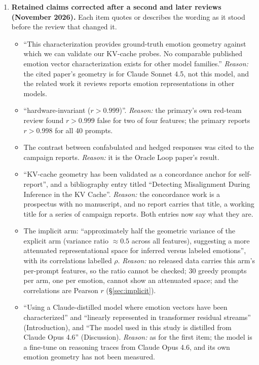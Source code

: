 \begin{enumerate}[leftmargin=*]
\begin{itemize}[nosep]
    \end{itemize}
    \item \label{app:item:secondread}\textbf{Retained claims corrected after a second and later reviews (November 2026).} Each item quotes or describes the wording as it stood before the review that changed it.
    \begin{itemize}[nosep]
        \item ``This characterization provides ground-truth emotion geometry against which we can validate our KV-cache probes. No comparable published emotion vector characterization exists for other model families.'' \emph{Reason:} the cited paper's geometry is for Claude Sonnet 4.5, not this model, and the related work it reviews reports emotion representations in other models.
        \item ``hardware-invariant ($r > 0.999$)''. \emph{Reason:} the primary's own red-team review found $r > 0.999$ false for two of four features; the primary reports $r > 0.998$ for all 40 prompts.
        \item The contrast between confabulated and hedged responses was cited to the campaign reports. \emph{Reason:} it is the Oracle Loop paper's result.
        \item ``KV-cache geometry has been validated as a concordance anchor for self-report'', and a bibliography entry titled ``Detecting Misalignment During Inference in the {KV} Cache''. \emph{Reason:} the concordance work is a prospectus with no manuscript, and no report carries that title, a working title for a series of campaign reports. Both entries now say what they are.
        \item The implicit arm: ``approximately half the geometric variance of the explicit arm (variance ratio $\approx 0.5$ across all features), suggesting a more attenuated representational space for inferred versus labeled emotions'', with its correlations labelled $\rho$. \emph{Reason:} no released data carries this arm's per-prompt features, so the ratio cannot be checked; 30 greedy prompts per arm, one per emotion, cannot show an attenuated space; and the correlations are Pearson $r$ (\S\ref{sec:implicit}).
        \item ``Using a Claude-distilled model where emotion vectors have been characterized'' and ``linearly represented in transformer residual streams'' (Introduction), and ``The model used in this study is distilled from Claude Opus 4.6'' (Discussion). \emph{Reason:} as for the first item; the model is a fine-tune on reasoning traces from Claude Opus 4.6, and its own emotion geometry has not been measured.

\end{itemize}
\end{enumerate}

